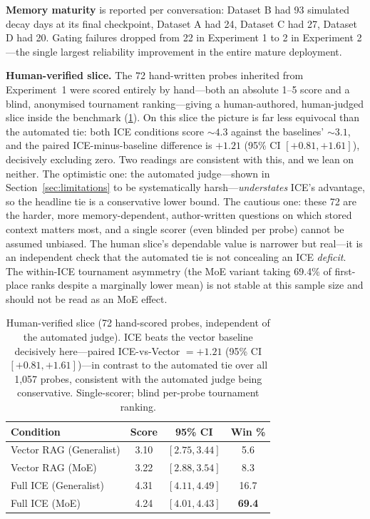\documentclass[10pt]{article}
\begin{document}
\textbf{Memory maturity} is reported per conversation: Dataset B had 93 simulated decay days at its final checkpoint, Dataset A had 24, Dataset C had 27, Dataset D had 20. Gating failures dropped from 22 in Experiment 1 to 2 in Experiment 2---the single largest reliability improvement in the entire mature deployment.

\textbf{Human-verified slice.} The 72 hand-written probes inherited from Experiment~1 were scored entirely by hand---both an absolute 1--5 score and a blind, anonymised tournament ranking---giving a human-authored, human-judged slice inside the benchmark (\cref{tab:manual}). On this slice the picture is far less equivocal than the automated tie: both ICE conditions score ${\sim}4.3$ against the baselines' ${\sim}3.1$, and the paired ICE-minus-baseline difference is $+1.21$ (95\% CI $[+0.81, +1.61]$), decisively excluding zero. Two readings are consistent with this, and we lean on neither. The optimistic one: the automated judge---shown in Section~\ref{sec:limitations} to be systematically harsh---\emph{understates} ICE's advantage, so the headline tie is a conservative lower bound. The cautious one: these 72 are the harder, more memory-dependent, author-written questions on which stored context matters most, and a single scorer (even blinded per probe) cannot be assumed unbiased. The human slice's dependable value is narrower but real---it is an independent check that the automated tie is not concealing an ICE \emph{deficit}. The within-ICE tournament asymmetry (the MoE variant taking 69.4\% of first-place ranks despite a marginally lower mean) is not stable at this sample size and should not be read as an MoE effect.

\begin{table}[htbp]
\centering
\small
\caption{Human-verified slice (72 hand-scored probes, independent of the automated judge). ICE beats the vector baseline decisively here---paired ICE-vs-Vector $= +1.21$ (95\% CI $[+0.81, +1.61]$)---in contrast to the automated tie over all 1{,}057 probes, consistent with the automated judge being conservative. Single-scorer; blind per-probe tournament ranking.}
\label{tab:manual}
\begin{tabular}{@{}lccc@{}}
\toprule
\textbf{Condition} & \textbf{Score} & \textbf{95\% CI} & \textbf{Win \%} \\
\midrule
Vector RAG (Generalist) & 3.10 & $[2.75, 3.44]$ & 5.6 \\
Vector RAG (MoE)        & 3.22 & $[2.88, 3.54]$ & 8.3 \\
Full ICE (Generalist)   & 4.31 & $[4.11, 4.49]$ & 16.7 \\
Full ICE (MoE)          & 4.24 & $[4.01, 4.43]$ & \textbf{69.4} \\
\bottomrule
\end{tabular}
\end{table}
\end{document}
